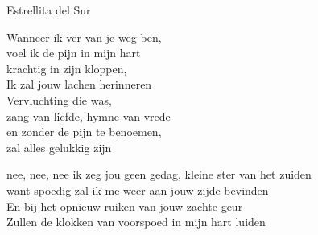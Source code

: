 \begin{song}[vals]{Estrellita del Sur}
\clearpage
\begin{translation}
Wanneer ik ver van je weg ben,\\
voel ik de pijn in mijn hart\\
krachtig in zijn kloppen,\\
Ik zal jouw lachen herinneren\\
Vervluchting die was,\\
zang van liefde, hymne van vrede\\
en zonder de pijn te benoemen,\\
zal alles gelukkig zijn\vspace{\wlskip}

nee, nee, nee ik zeg jou geen gedag, kleine ster van het zuiden\\
want spoedig zal ik me weer aan jouw zijde bevinden\\
En bij het opnieuw ruiken van jouw zachte geur\\
Zullen de klokken van voorspoed in mijn hart luiden\\
\end{translation}
\end{song}

